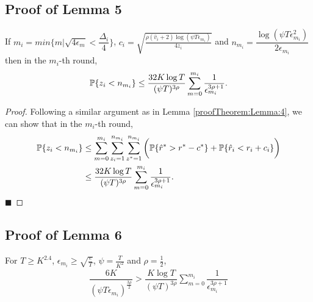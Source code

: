 \subsection{Proof of Lemma 5}
\label{App:Lemma:5}
\begin{lemma}
If $m_i = min\lbrace m|\sqrt{4\epsilon_{m} } < \dfrac{\Delta_i}{4} \rbrace $, $c_{i} =\sqrt{\frac{\rho (\hat{v}_i + 2)\log (\psi T\epsilon_{m_{i}})}{4 z_i}}$ and $n_{m_i}=\dfrac{\log{(\psi T\epsilon_{m_{i}}^{2})}}{2\epsilon_{m_{i}}}$ then in the $m_i$-th round, 
\begin{align*}
\mathbb{P}\lbrace z_i < n_{m_i} \rbrace \leq \dfrac{32K\log T}{(\psi T)^{3\rho}}\sum_{m=0}^{m_i}\dfrac{1}{\epsilon_{m_i}^{3\rho + 1}}.
\end{align*}
\end{lemma}

\begin{proof}
Following a similar argument as in Lemma \ref{proofTheorem:Lemma:4}, we can show that in the $m_i$-th round,
\begin{align*}
\mathbb{P}\lbrace z_i < n_{m_i} \rbrace &\leq \sum_{m=0}^{m_i}\sum_{z_i =1}^{n_{m_i}}\sum_{z^* =1}^{n_{m_i}}\bigg(\mathbb{P}\lbrace \hat{r}^* > r^* - c^{*}\rbrace + \mathbb{P}\lbrace \hat{r}_i < r_i + c_i\rbrace\bigg) \\
&\leq \dfrac{32K\log T}{(\psi T)^{3\rho}}\sum_{m=0}^{m_i}\dfrac{1}{\epsilon_{m_i}^{3\rho + 1}}.
\end{align*}
\hfill $\blacksquare$	
\end{proof}

\subsection{Proof of Lemma 6}
\label{App:Lemma:6}
\begin{lemma}
For $T\geq K^{2.4}$, $\epsilon_{m_i}\geq \sqrt{\frac{e}{T}}$, $\psi=\frac{T}{K^2}$ and $\rho=\frac{1}{2}$,  
\begin{align*}
\dfrac{6K}{(\psi T \epsilon_{m_i})^{\frac{3\rho}{2}}} > \dfrac{K\log T}{(\psi T)^{3\rho}}\sum_{m=0}^{m_i}\dfrac{1}{\epsilon_{m_i}^{3\rho + 1}}
\end{align*}
\end{lemma}

